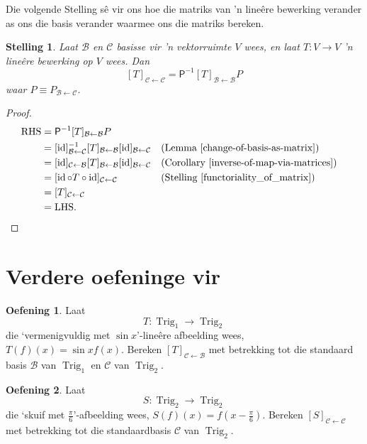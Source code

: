 \documentclass[a4paper,11pt]{book}
\newtheorem{theorem}{Stelling}
\theoremstyle{definition}
\newtheorem{exercise}{Oefening}
\newcommand{\mat}[1]{\mathsf{#1}}
\newcommand{\basis}[1]{{\mathcal #1}}
\newcommand{\furtherexercises}{\section*{Verdere oefeninge vir
\thesection}}
\DeclareMathOperator{\Trig}{Trig}
\DeclareMathOperator{\id}{id}
\begin{document}
Die volgende Stelling s{\^e} vir ons hoe die matriks van 'n line{\^e}re
bewerking verander as ons die basis verander waarmee ons die matriks
bereken.

\begin{theorem} \label{matrix-in-different-basis}Laat $\basis{B}$ en
	$\basis{C}$ basisse vir 'n vektorruimte $V$ wees, en laat $T : V
	\rightarrow V$ 'n line{\^e}re bewerking op $V$ wees. Dan
	\[
		[T]_{\basis{C} \leftarrow \basis{C}} = \mat{P}^{-1} [T]_{\basis{B}
		\leftarrow \basis{B}} P
	\]
	waar $P \equiv P_{\basis{B} \leftarrow \basis{C}}$.
\end{theorem}
\begin{proof}
	\begin{align*}
		\mbox{RHS} &= \mat{P}^{-1} [T]_{\basis{B} \leftarrow \basis{B}} P \\
		&= [\id]_{\basis{B} \leftarrow \basis{C}}^{-1} [T]_{\basis{B}
		\leftarrow \basis{B}} [\id]_{\basis{B} \leftarrow \basis{C}} &&
		\mbox{(Lemma  \ref{change-of-basis-as-matrix})} \\
		&= [\id]_{\basis{C} \leftarrow \basis{B}} [T]_{\basis{B} \leftarrow
		\basis{B}} [\id]_{\basis{B} \leftarrow \basis{C}} && \mbox
		{(Corollary \ref{inverse-of-map-via-matrices})} \\
		&= [ \id \circ T \circ \id]_{\basis{C} \leftarrow \basis{C}} &&
		\mbox{(Stelling \ref{functoriality_of_matrix})} \\
		&= [T]_{\basis{C} \leftarrow \basis{C}}  \\
		&= \mbox{LHS}.
	\end{align*}
\end{proof}

\furtherexercises

\begin{exercise} \label{trig_ex_1} Laat
	\[
		T : \Trig_1 \rightarrow \Trig_2
	\] 
	die `vermenigvuldig met $\sin x$'-line{\^e}re afbeelding wees, $T(f)(x)
	= \sin x f(x)$. Bereken $[T]_{\basis{C} \leftarrow \basis{B}}$ met
	betrekking tot die standaard basis $\basis{B}$ van $\Trig_1$ en
	$\basis{C}$ van $\Trig_2$.
\end{exercise}

\begin{exercise} \label{trig_ex_2} Laat
	\[
		S : \Trig_2 \rightarrow \Trig_2
	\] 
	die `skuif met $\frac{\pi}{6}$'-afbeelding wees, $S(f)(x) = f(x -
	\frac{\pi}{6})$. Bereken $[S]_{\basis{C} \leftarrow \basis{C}}$ met
	betrekking tot die standaardbasis $\basis{C}$ van $\Trig_2$.
\end{exercise}
\end{document}

